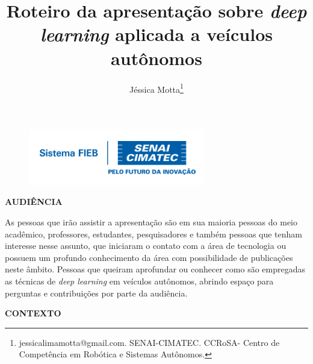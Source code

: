 \documentclass[12pt,a4paper]{article}
\begin{document}
 
\begin{figure}
    \flushright
    \includegraphics[scale=0.5]{Logo_senai.png}
\end{figure}

\title{Roteiro da apresentação sobre \emph{deep learning} aplicada a veículos autônomos}
\author{Jéssica Motta\thanks{jessicalimamotta@gmail.com. SENAI-CIMATEC. CCRoSA- Centro de Competência em Robótica e Sistemas Autônomos.}}
 

    \maketitle
    \singlespacing

    
    \textbf{AUDIÊNCIA}

    \par As pessoas que irão assistir a apresentação são em sua maioria pessoas do meio acadêmico, professores, estudantes, pesquisadores e também pessoas que tenham interesse nesse assunto, que iniciaram o contato com a área de tecnologia ou possuem um profundo conhecimento da área com possibilidade de publicações neste âmbito. Pessoas que queiram aprofundar ou conhecer como são empregadas as técnicas de \emph{deep learning} em veículos autônomos, abrindo espaço para perguntas e contribuições por parte da audiência.


    \textbf{CONTEXTO}
\end{document}

